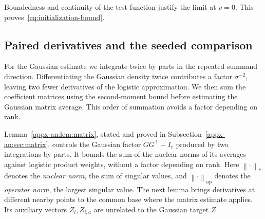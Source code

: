 \documentclass[11pt,letterpaper]{article}
\theoremstyle{remark}
\newcommand{\op}{\mathrm{op}}
\newcommand{\norm}[1]{\left\lVert#1\right\rVert}
\begin{document}
Boundedness and continuity of the test function justify the limit
at \(v=0\). This proves~\eqref{eq:initialization-bound}.

\subsection{Paired derivatives and the seeded comparison}
\label{appx-an:sec:restoration}

For the Gaussian estimate we integrate twice by parts in the repeated
summand direction. Differentiating the Gaussian density twice contributes a factor
\(\sigma^{-2}\), leaving two fewer derivatives of the logistic
approximation. We then sum the coefficient matrices using the
second-moment bound before estimating the Gaussian matrix average.
This order of summation avoids a factor depending on rank.

Lemma~\ref{appx-an:lem:matrix}, stated and proved in
Subsection~\ref{appx-an:sec:matrix}, controls the Gaussian factor
\(GG^\top-I_r\) produced by two integrations by parts. It bounds
the sum of the nuclear norms of its averages against logistic product
weights, without a factor depending on rank. Here
\(\norm{\cdot}_*\) denotes the \emph{nuclear norm}, the sum of singular
values, and \(\norm{\cdot}_\op\) denotes the \emph{operator norm},
the largest singular value. The next lemma brings derivatives at
different nearby points to the common base where the matrix estimate
applies. Its auxiliary vectors \(Z_i,Z_{i,a}\) are unrelated to the
Gaussian target \(Z\).
\end{document}
